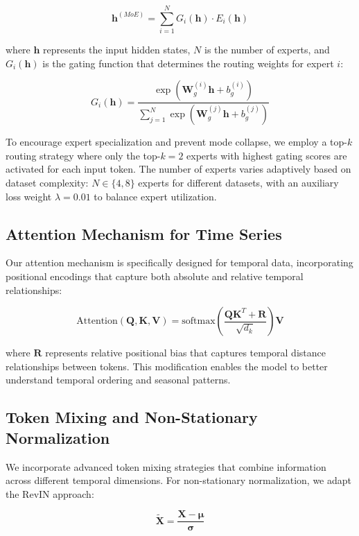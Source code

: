\documentclass{article}
\begin{document}
\begin{equation}
\mathbf{h}^{(MoE)} = \sum_{i=1}^{N} G_i(\mathbf{h}) \cdot E_i(\mathbf{h})
\end{equation}

where $\mathbf{h}$ represents the input hidden states, $N$ is the number of experts, and $G_i(\mathbf{h})$ is the gating function that determines the routing weights for expert $i$:

\begin{equation}
G_i(\mathbf{h}) = \frac{\exp(\mathbf{W}_g^{(i)} \mathbf{h} + b_g^{(i)})}{\sum_{j=1}^{N} \exp(\mathbf{W}_g^{(j)} \mathbf{h} + b_g^{(j)})}
\end{equation}

To encourage expert specialization and prevent mode collapse, we employ a top-$k$ routing strategy where only the top-$k=2$ experts with highest gating scores are activated for each input token. The number of experts varies adaptively based on dataset complexity: $N \in \{4, 8\}$ experts for different datasets, with an auxiliary loss weight $\lambda = 0.01$ to balance expert utilization.

\subsection{Attention Mechanism for Time Series}
Our attention mechanism is specifically designed for temporal data, incorporating positional encodings that capture both absolute and relative temporal relationships:

\begin{equation}
\text{Attention}(\mathbf{Q}, \mathbf{K}, \mathbf{V}) = \text{softmax}\left(\frac{\mathbf{Q}\mathbf{K}^T + \mathbf{R}}{\sqrt{d_k}}\right)\mathbf{V}
\end{equation}

where $\mathbf{R}$ represents relative positional bias that captures temporal distance relationships between tokens. This modification enables the model to better understand temporal ordering and seasonal patterns.

\subsection{Token Mixing and Non-Stationary Normalization}
We incorporate advanced token mixing strategies that combine information across different temporal dimensions. For non-stationary normalization, we adapt the RevIN approach:

\begin{equation}
\tilde{\mathbf{X}} = \frac{\mathbf{X} - \boldsymbol{\mu}}{\boldsymbol{\sigma}}
\end{equation}
\end{document}
